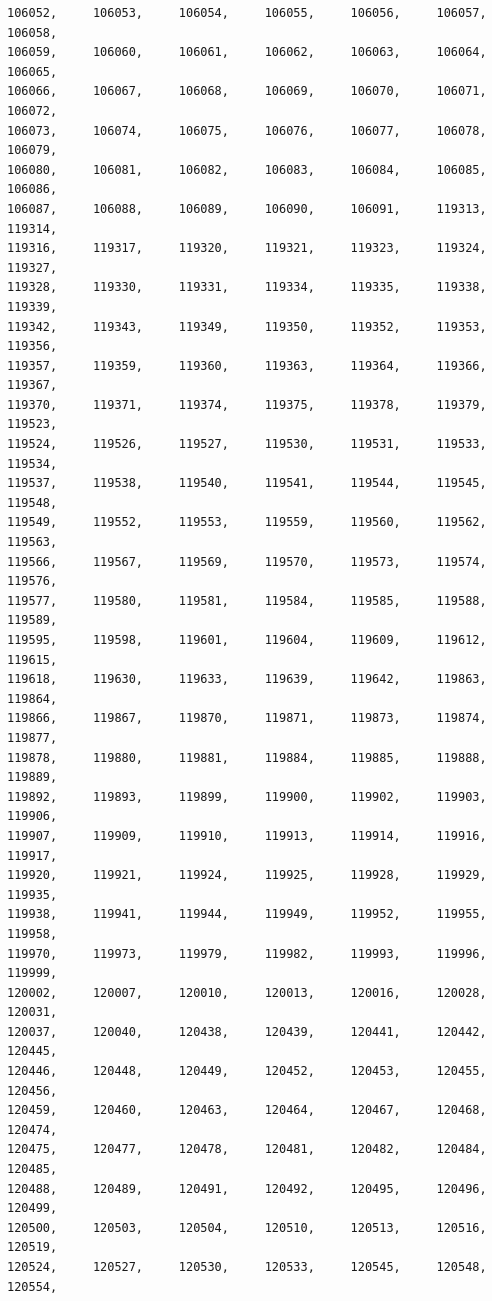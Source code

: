 \documentclass[a4paper,11pt]{report}
\begin{document}
\begin{verbatim}
106052,     106053,     106054,     106055,     106056,     106057,     106058,
106059,     106060,     106061,     106062,     106063,     106064,     106065,
106066,     106067,     106068,     106069,     106070,     106071,     106072,
106073,     106074,     106075,     106076,     106077,     106078,     106079,
106080,     106081,     106082,     106083,     106084,     106085,     106086,
106087,     106088,     106089,     106090,     106091,     119313,     119314,
119316,     119317,     119320,     119321,     119323,     119324,     119327,
119328,     119330,     119331,     119334,     119335,     119338,     119339,
119342,     119343,     119349,     119350,     119352,     119353,     119356,
119357,     119359,     119360,     119363,     119364,     119366,     119367,
119370,     119371,     119374,     119375,     119378,     119379,     119523,
119524,     119526,     119527,     119530,     119531,     119533,     119534,
119537,     119538,     119540,     119541,     119544,     119545,     119548,
119549,     119552,     119553,     119559,     119560,     119562,     119563,
119566,     119567,     119569,     119570,     119573,     119574,     119576,
119577,     119580,     119581,     119584,     119585,     119588,     119589,
119595,     119598,     119601,     119604,     119609,     119612,     119615,
119618,     119630,     119633,     119639,     119642,     119863,     119864,
119866,     119867,     119870,     119871,     119873,     119874,     119877,
119878,     119880,     119881,     119884,     119885,     119888,     119889,
119892,     119893,     119899,     119900,     119902,     119903,     119906,
119907,     119909,     119910,     119913,     119914,     119916,     119917,
119920,     119921,     119924,     119925,     119928,     119929,     119935,
119938,     119941,     119944,     119949,     119952,     119955,     119958,
119970,     119973,     119979,     119982,     119993,     119996,     119999,
120002,     120007,     120010,     120013,     120016,     120028,     120031,
120037,     120040,     120438,     120439,     120441,     120442,     120445,
120446,     120448,     120449,     120452,     120453,     120455,     120456,
120459,     120460,     120463,     120464,     120467,     120468,     120474,
120475,     120477,     120478,     120481,     120482,     120484,     120485,
120488,     120489,     120491,     120492,     120495,     120496,     120499,
120500,     120503,     120504,     120510,     120513,     120516,     120519,
120524,     120527,     120530,     120533,     120545,     120548,     120554,

\end{verbatim}
\end{document}
